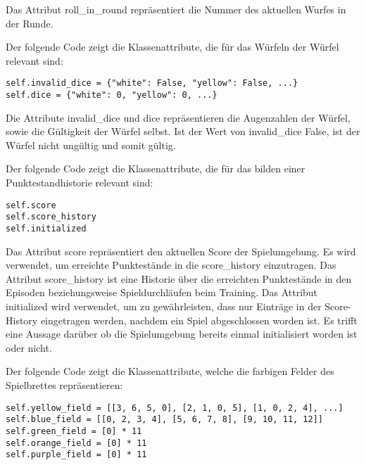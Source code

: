 Das Attribut roll\_in\_round repräsentiert die Nummer des aktuellen Wurfes in der Runde.\\

\begin{minipage}{\linewidth}
Der folgende Code zeigt die Klassenattribute, die für das Würfeln der Würfel relevant sind:
\vspace{0.5cm}
\begin{lstlisting}[caption={Klassenattribute für Würfel}]
self.invalid_dice = {"white": False, "yellow": False, ...}
self.dice = {"white": 0, "yellow": 0, ...}
\end{lstlisting}
\end{minipage}

Die Attribute invalid\_dice und dice repräsentieren die Augenzahlen der Würfel, sowie die Gültigkeit der Würfel selbst. Ist der Wert von invalid\_dice False, ist der Würfel nicht ungültig und somit gültig.\\

\begin{minipage}{\linewidth}
Der folgende Code zeigt die Klassenattribute, die für das bilden einer Punktestandhistorie relevant sind:
\vspace{0.5cm}
\begin{lstlisting}[caption={Klassenattribute für Punktestand}]
self.score
self.score_history
self.initialized
\end{lstlisting}
\end{minipage}

Das Attribut score repräsentiert den aktuellen Score der Spielumgebung. Es wird verwendet, um erreichte Punktestände in die score\_history einzutragen. Das Attribut score\_history ist eine Historie über die erreichten Punktestände in den Episoden beziehungsweise Spieldurchläufen beim Training. Das Attribut initialized wird verwendet, um zu gewährleisten, dass nur Einträge in der Score-History eingetragen werden, nachdem ein Spiel abgeschlossen worden ist. Es trifft eine Aussage darüber ob die Spielumgebung bereits einmal initialisiert worden ist oder nicht.\\

\begin{minipage}{\linewidth}
Der folgende Code zeigt die Klassenattribute, welche die farbigen Felder des Spielbrettes repräsentieren:
\vspace{0.5cm}
\begin{lstlisting}[caption={Klassenattribute für farbige Felder}]
self.yellow_field = [[3, 6, 5, 0], [2, 1, 0, 5], [1, 0, 2, 4], ...]
self.blue_field = [[0, 2, 3, 4], [5, 6, 7, 8], [9, 10, 11, 12]]
self.green_field = [0] * 11
self.orange_field = [0] * 11
self.purple_field = [0] * 11
\end{lstlisting}
\end{minipage}

